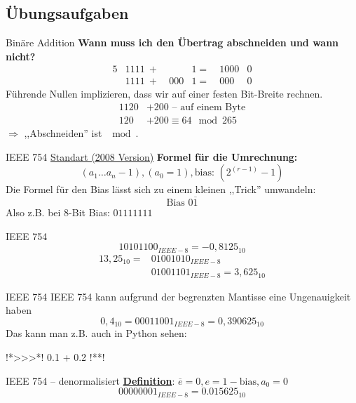 \documentclass[aspectratio=169,usepdftitle=true,11pt,ngerman,t]{beamer}
\begin{document}
\subsection{Übungsaufgaben}

\begin{frame}{Binäre Addition}
    \textbf{Wann muss ich den Übertrag abschneiden und wann nicht?}
    \begin{alignat*}{5}
        &1111\ +&\    &1 =&\ 1000&0\\
        &1111\ +&\ 000&1 =&\  000&0
    \end{alignat*}
    Führende Nullen implizieren, dass wir auf einer festen Bit-Breite rechnen.
    \bigskip\bigskip
    \begin{alignat*}{1}
        120 &+ 200 \text{ -- auf einem Byte}\\
        120 &+ 200 \equiv 64 \mod{265}
    \end{alignat*}
    $\Rightarrow$ ,,Abschneiden'' ist $\mod{}$.
\end{frame}

\begin{frame}{IEEE 754}
    \href{https://web.archive.org/web/20160806053349/http://www.csee.umbc.edu/~tsimo1/CMSC455/IEEE-754-2008.pdf}{Standart (2008 Version)}
    \bigskip
    \textbf{Formel für die Umrechnung:}
    $$(a_1\dots a_n-1), (a_0=1), \text{bias: }(2^{(r-1)}-1)$$
    \medskip
    Die Formel für den Bias lässt sich zu einem kleinen ,,Trick'' umwandeln:
    $$\text{Bias } 0\overline{1}$$
    Also z.B. bei $8$-Bit Bias: $01111111$
\end{frame}

\begin{frame}{IEEE 754}
    $$10101100_{IEEE-8} = -0,8125_{10}$$
    \bigskip\bigskip
    \begin{alignat*}{1}
        3,25_{10} = &01001010_{IEEE-8}\\
        &01001101_{IEEE-8} = 3,625_{10}
    \end{alignat*}
\end{frame}

\begin{frame}[fragile]{IEEE 754}
    IEEE 754 kann aufgrund der begrenzten Mantisse eine Ungenauigkeit haben
    $$0,4_{10} = 00011001_{IEEE-8} = 0,390625_{10}$$
    \medskip
    Das kann man z.B. auch in Python sehen:
    \begin{plainpython}
!*>{}>{}>*! 0.1 + 0.2
!**!
    \end{plainpython}
\end{frame}

\begin{frame}{IEEE 754 -- denormalisiert}
    \href{https://de.wikipedia.org/wiki/IEEE\_754\#Interpretation\_des\_Zahlenformats}{\bfseries Definition}: $\overline{e}=0, e=1-\text{bias}, a_0=0$
    \bigskip
    $$00000001_{IEEE-8} = 0.015625_{10}$$
\end{frame}
\end{document}
